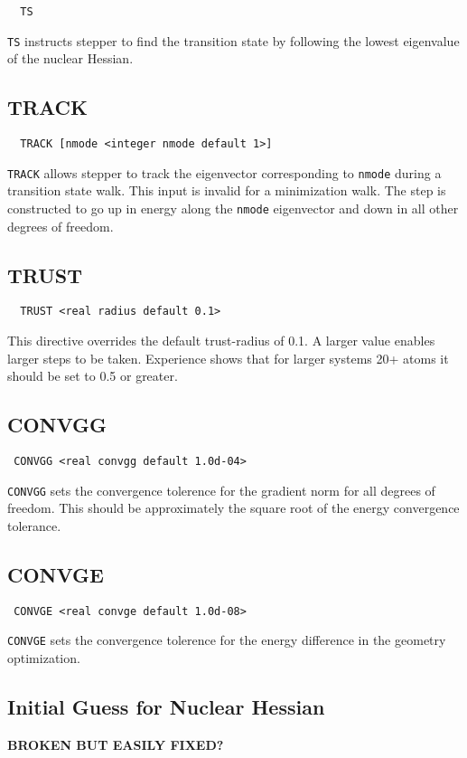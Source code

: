 \begin{verbatim}
  TS
\end{verbatim}

\verb+TS+ instructs stepper to find the transition state by following the
lowest eigenvalue of the nuclear Hessian.

\subsection{TRACK}

\begin{verbatim}
  TRACK [nmode <integer nmode default 1>]
\end{verbatim}

\verb+TRACK+ allows stepper to track the eigenvector corresponding to
\verb+nmode+ during a transition state walk.  This input is invalid
for a minimization walk.  The step is constructed to go up in energy
along the \verb+nmode+ eigenvector and down in all other degrees of
freedom.  

\subsection{TRUST}

\begin{verbatim}
  TRUST <real radius default 0.1>
\end{verbatim}

  This directive overrides the default trust-radius of 0.1.  A larger
value enables larger steps to be taken. Experience shows that for
larger systems 20+ atoms it should be set to 0.5 or greater.

\subsection{CONVGG}
\begin{verbatim}
 CONVGG <real convgg default 1.0d-04>
\end{verbatim}

\verb+CONVGG+ sets the convergence tolerence for the gradient norm for
all degrees of freedom.  This should be approximately the square root
of the energy convergence tolerance.  

\subsection{CONVGE}
\begin{verbatim}
 CONVGE <real convge default 1.0d-08>
\end{verbatim}

\verb+CONVGE+ sets the convergence tolerence for the energy difference
in the geometry optimization.  


\subsection{Initial Guess for Nuclear Hessian}

{\bf BROKEN BUT EASILY FIXED?}

